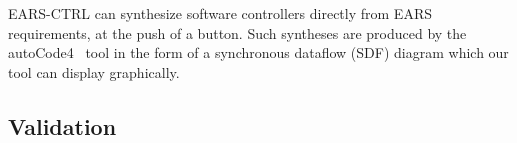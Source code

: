 \textsf{EARS-CTRL} can synthesize software controllers directly from EARS
requirements, at the push of a button. Such syntheses are produced 
by the \textsf{autoCode4}~\cite{autoCode17} tool in the form
of a synchronous dataflow (SDF) diagram which our tool can display
graphically.\vspace{-.3cm}


\subsection{Validation}
\vspace{-.1cm}

